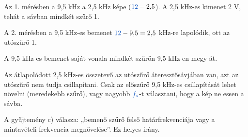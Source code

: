 Az 1. mérésben a 9,5 kHz a 2,5 kHz képe (${\ca{12}}-2{,}5$). A 2,5 kHz-es kimenet 2 V, tehát a sávban mindkét szűrő 1.

\begin{center}\end{center}

A 2. mérésben a 9,5 kHz-es bemenet ${\ca{12}}-9{,}5=2{,}5$ kHz-re lapolódik, ott az utószűrő 1.

\begin{center}\end{center}

A 9,5 kHz-es bemenet saját vonala mindkét szűrőn 9,5 kHz-en megy át.

\begin{center}\end{center}

Az átlapolódott 2,5 kHz-es összetevő az utószűrő áteresztősávjában van, azt az utószűrő nem tudja csillapítani. Csak az előszűrő 9,5 kHz-es csillapítását lehet növelni (meredekebb szűrő), vagy nagyobb ${\ca{f_s}}$-t választani, hogy a kép ne essen a sávba.
\begin{tipp}
A gyűjtemény c) válasza: „bemenő szűrő felső határfrekvenciája vagy a mintavételi frekvencia megnövelése”. Ez helyes irány.
\end{tipp}
\begin{eredmeny}

\begin{center}\end{center}
\end{eredmeny}


